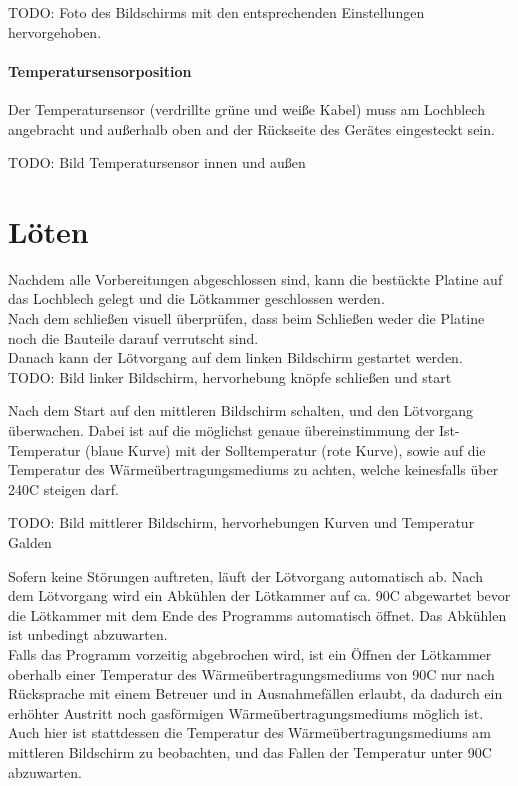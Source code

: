 \documentclass{\basedir/fablab-document}
\begin{document}
TODO: Foto des Bildschirms mit den entsprechenden Einstellungen hervorgehoben.

\paragraph{Temperatursensorposition}

Der Temperatursensor (verdrillte grüne und weiße Kabel) muss am Lochblech angebracht und außerhalb oben and der Rückseite des Gerätes eingesteckt sein.

TODO: Bild Temperatursensor innen und außen

\section{Löten}

Nachdem alle Vorbereitungen abgeschlossen sind, kann die bestückte Platine auf das Lochblech gelegt und die Lötkammer geschlossen werden.\\

Nach dem schließen visuell überprüfen, dass beim Schließen weder die Platine noch die Bauteile darauf verrutscht sind.\\

Danach kann der Lötvorgang auf dem linken Bildschirm gestartet werden.\\

TODO: Bild linker Bildschirm, hervorhebung knöpfe schließen und start

Nach dem Start auf den mittleren Bildschirm schalten, und den Lötvorgang überwachen. Dabei ist auf die möglichst genaue übereinstimmung der Ist-Temperatur (blaue Kurve) mit der Solltemperatur (rote Kurve), sowie auf die Temperatur des Wärmeübertragungsmediums zu achten, welche keinesfalls über 240C steigen darf. 

TODO: Bild mittlerer Bildschirm, hervorhebungen Kurven und Temperatur Galden

Sofern keine Störungen auftreten, läuft der Lötvorgang automatisch ab. Nach dem Lötvorgang wird ein Abkühlen der Lötkammer auf ca. 90C abgewartet bevor die Lötkammer mit dem Ende des Programms automatisch öffnet. Das Abkühlen ist unbedingt abzuwarten.\\

Falls das Programm vorzeitig abgebrochen wird, ist ein Öffnen der Lötkammer oberhalb einer Temperatur des Wärmeübertragungsmediums von 90C nur nach Rücksprache mit einem Betreuer und in Ausnahmefällen erlaubt, da dadurch ein erhöhter Austritt noch gasförmigen Wärmeübertragungsmediums möglich ist. Auch hier ist stattdessen die Temperatur des Wärmeübertragungsmediums am mittleren Bildschirm zu beobachten, und das Fallen der Temperatur unter 90C abzuwarten.\\
\end{document}
